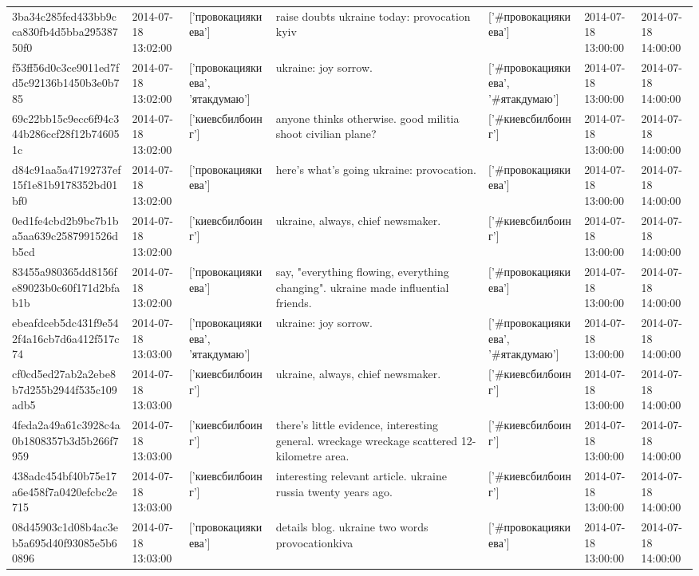 \begin{tabular}{lllllll}
3ba34c285fed433bb9cca830fb4d5bba29538750f0 & 2014-07-18 13:02:00 & ['провокациякиева'] & raise doubts ukraine today: provocation kyiv & ['#провокациякиева'] & 2014-07-18 13:00:00 & 2014-07-18 14:00:00 \\
f53ff56d0c3ce9011ed7fd5c92136b1450b3e0b785 & 2014-07-18 13:02:00 & ['провокациякиева', 'ятакдумаю'] & ukraine: joy sorrow. & ['#провокациякиева', '#ятакдумаю'] & 2014-07-18 13:00:00 & 2014-07-18 14:00:00 \\
69c22bb15c9ecc6f94c344b286ccf28f12b746051c & 2014-07-18 13:02:00 & ['киевсбилбоинг'] & anyone thinks otherwise. good militia shoot civilian plane? & ['#киевсбилбоинг'] & 2014-07-18 13:00:00 & 2014-07-18 14:00:00 \\
d84c91aa5a47192737ef15f1e81b9178352bd01bf0 & 2014-07-18 13:02:00 & ['провокациякиева'] & here's what's going ukraine: provocation. & ['#провокациякиева'] & 2014-07-18 13:00:00 & 2014-07-18 14:00:00 \\
0ed1fe4cbd2b9bc7b1ba5aa639c2587991526db5cd & 2014-07-18 13:02:00 & ['киевсбилбоинг'] & ukraine, always, chief newsmaker. & ['#киевсбилбоинг'] & 2014-07-18 13:00:00 & 2014-07-18 14:00:00 \\
83455a980365dd8156fe89023b0c60f171d2bfab1b & 2014-07-18 13:02:00 & ['провокациякиева'] & say, "everything flowing, everything changing". ukraine made influential friends. & ['#провокациякиева'] & 2014-07-18 13:00:00 & 2014-07-18 14:00:00 \\
ebeafdceb5dc431f9e542f4a16cb7d6a412f517c74 & 2014-07-18 13:03:00 & ['провокациякиева', 'ятакдумаю'] & ukraine: joy sorrow. & ['#провокациякиева', '#ятакдумаю'] & 2014-07-18 13:00:00 & 2014-07-18 14:00:00 \\
cf0cd5ed27ab2a2ebe8b7d255b2944f535c109adb5 & 2014-07-18 13:03:00 & ['киевсбилбоинг'] & ukraine, always, chief newsmaker. & ['#киевсбилбоинг'] & 2014-07-18 13:00:00 & 2014-07-18 14:00:00 \\
4feda2a49a61c3928c4a0b1808357b3d5b266f7959 & 2014-07-18 13:03:00 & ['киевсбилбоинг'] & there's little evidence, interesting general. wreckage wreckage scattered 12-kilometre area. & ['#киевсбилбоинг'] & 2014-07-18 13:00:00 & 2014-07-18 14:00:00 \\
438adc454bf40b75e17a6e458f7a0420efcbc2e715 & 2014-07-18 13:03:00 & ['киевсбилбоинг'] & interesting relevant article. ukraine russia twenty years ago. & ['#киевсбилбоинг'] & 2014-07-18 13:00:00 & 2014-07-18 14:00:00 \\
08d45903c1d08b4ac3eb5a695d40f93085e5b60896 & 2014-07-18 13:03:00 & ['провокациякиева'] & details blog. ukraine two words provocationkiva & ['#провокациякиева'] & 2014-07-18 13:00:00 & 2014-07-18 14:00:00 \\

\end{tabular}
